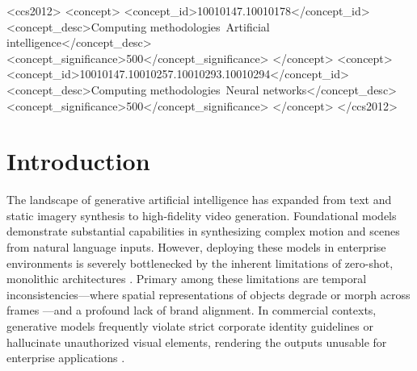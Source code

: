 \documentclass[sigconf,authordraft]{acmart}
\begin{document}
\begin{CCSXML}
<ccs2012>
   <concept>
       <concept_id>10010147.10010178</concept_id>
       <concept_desc>Computing methodologies~Artificial intelligence</concept_desc>
       <concept_significance>500</concept_significance>
       </concept>
   <concept>
       <concept_id>10010147.10010257.10010293.10010294</concept_id>
       <concept_desc>Computing methodologies~Neural networks</concept_desc>
       <concept_significance>500</concept_significance>
       </concept>
 </ccs2012>
\end{CCSXML}



\maketitle

\section{Introduction}

The landscape of generative artificial intelligence has expanded from text and static imagery synthesis to high-fidelity video generation. Foundational models \cite{brooks2024video, deepmind2024veo} demonstrate substantial capabilities in synthesizing complex motion and scenes from natural language inputs. However, deploying these models in enterprise environments is severely bottlenecked by the inherent limitations of zero-shot, monolithic architectures \cite{zaharia2024shift}. Primary among these limitations are temporal inconsistencies—where spatial representations of objects degrade or morph across frames \cite{blattmann2024temporal}—and a profound lack of brand alignment. In commercial contexts, generative models frequently violate strict corporate identity guidelines or hallucinate unauthorized visual elements, rendering the outputs unusable for enterprise applications \cite{ji2023survey}.
\end{document}
